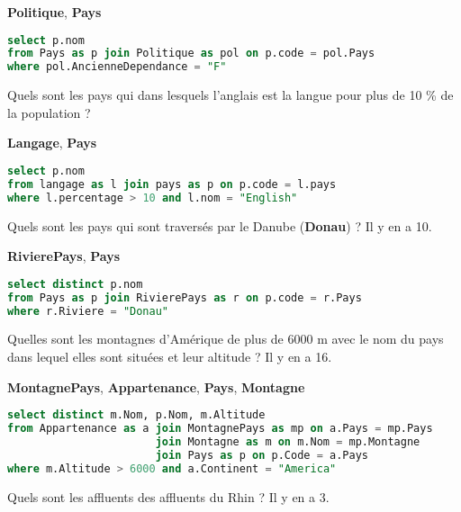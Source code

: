 {\bf Politique}, {\bf Pays}
\begin{Answer}
\begin{lstlisting}[language=SQL]
select p.nom
from Pays as p join Politique as pol on p.code = pol.Pays
where pol.AncienneDependance = "F"\end{lstlisting}
\end{Answer}
\begin{Exercise}
Quels sont les pays qui dans lesquels l'anglais est la langue pour plus de 10 \% de la population ?

\end{Exercise}
{\bf Langage}, {\bf Pays}
\begin{Answer}
\begin{lstlisting}[language=SQL]
select p.nom
from langage as l join pays as p on p.code = l.pays
where l.percentage > 10 and l.nom = "English"\end{lstlisting}
\end{Answer}
\newpage
\begin{Exercise}
Quels sont les pays qui sont traversés par le Danube ({\bf Donau}) ? Il y en a 10.
\end{Exercise}
{\bf RivierePays}, {\bf Pays}
\begin{Answer}
\begin{lstlisting}[language=SQL]
select distinct p.nom
from Pays as p join RivierePays as r on p.code = r.Pays
where r.Riviere = "Donau"
\end{lstlisting}
\end{Answer}
\begin{Exercise}
Quelles sont les montagnes d'Amérique de plus de 6000 m avec le nom du pays dans lequel elles sont situées et leur altitude ? Il y en a 16.
\end{Exercise}
{\bf MontagnePays}, {\bf Appartenance}, {\bf Pays}, {\bf Montagne}
\begin{Answer}
\begin{lstlisting}[language=SQL]
select distinct m.Nom, p.Nom, m.Altitude
from Appartenance as a join MontagnePays as mp on a.Pays = mp.Pays
                       join Montagne as m on m.Nom = mp.Montagne
                       join Pays as p on p.Code = a.Pays
where m.Altitude > 6000 and a.Continent = "America"
\end{lstlisting}

\newpage
\end{Answer}
\begin{Exercise}
Quels sont les affluents des affluents du Rhin ? Il y en a 3.
\end{Exercise}

